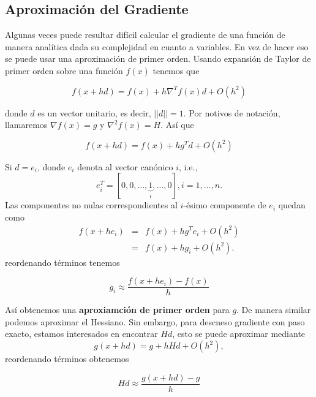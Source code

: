 \documentclass[11pt,letterpaper]{article}
\theoremstyle{definition}
\theoremstyle{definition}
\theoremstyle{definition}
\begin{document}
\subsection{Aproximación del Gradiente}
Algunas veces puede resultar difícil calcular el gradiente de una función de manera analítica dada su complejidad en cuanto a variables. En vez de hacer eso se puede usar una aproximación de primer orden. Usando expansión de Taylor de primer orden sobre una función $ f(x) $ tenemos que
\begin{shaded*}
	\begin{equation}
		f(x + hd) = f(x) + h \nabla^T f(x) d + O (h^2)
	\end{equation}
\end{shaded*}
donde $ d $ es un vector unitario, es decir, $ || d || = 1 $. Por notivos de notación, llamaremos $ \nabla f(x) = g $ y $ \nabla^2 f(x) = H $. Así que 
\begin{shaded*}
	\begin{equation*}
		f(x + hd) = f(x) + h g^T d + O (h^2)
	\end{equation*}
\end{shaded*}

Si $ d = e_i $, donde $ e_i $ denota al vector canónico $ i $, i.e.,
\begin{equation*}
	e_i^T = \left[ 0, 0, \dots, \underbrace{1}_{i}, \dots, 0 \right], i = 1, \dots, n.
\end{equation*}
Las componentes no nulas correspondientes al $ i $-ésimo componente de $ e_i $ quedan como
\begin{eqnarray*}
	f(x + h e_i) & = & f(x) + h g^T e_i + O(h^2) \\
	& = & f(x) + h g_i + O(h^2).
\end{eqnarray*}
reordenando términos tenemos
\begin{shaded*}
	\begin{equation*}
		g_i \approx \dfrac{f(x + h e_i) - f(x)}{h}
	\end{equation*}
\end{shaded*}
Así obtenemos una \textbf{aproxiamción de primer orden} para $ g $. De manera similar podemos aproximar el Hessiano. Sin embargo, para descneso gradiente con paso exacto, estamos interesados en encontrar $ Hd $, esto se puede aproximar mediante
\begin{equation*}
	g(x + hd) = g + h H d + O (h^2),
\end{equation*}
reordenando términos obtenemos
\begin{shaded*}
	\begin{equation*}
		Hd \approx \dfrac{g(x + hd) - g}{h}
	\end{equation*}
\end{shaded*}
\end{document}
